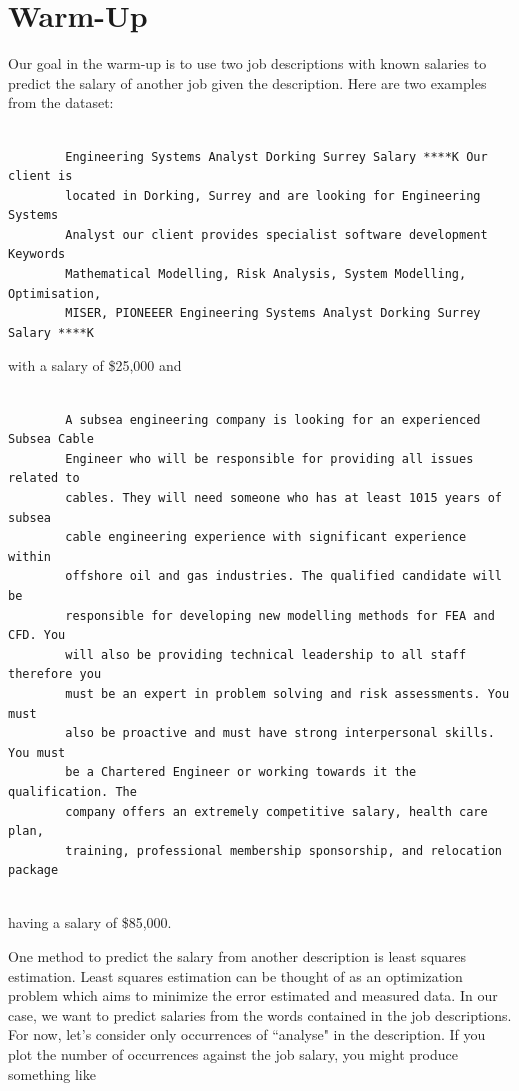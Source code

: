 \documentclass[12pt]{article}
\begin{document}
\section{Warm-Up}

    Our goal in the warm-up is to use two job descriptions with known
    salaries to predict the salary of another job given the description. Here
    are two examples from the dataset: 
    
    \begin{lstlisting}

        Engineering Systems Analyst Dorking Surrey Salary ****K Our client is
        located in Dorking, Surrey and are looking for Engineering Systems
        Analyst our client provides specialist software development Keywords
        Mathematical Modelling, Risk Analysis, System Modelling, Optimisation,
        MISER, PIONEEER Engineering Systems Analyst Dorking Surrey Salary ****K

    \end{lstlisting}

    with a salary of \$25,000 and 

    \begin{lstlisting}

        A subsea engineering company is looking for an experienced Subsea Cable
        Engineer who will be responsible for providing all issues related to
        cables. They will need someone who has at least 1015 years of subsea
        cable engineering experience with significant experience within
        offshore oil and gas industries. The qualified candidate will be
        responsible for developing new modelling methods for FEA and CFD. You
        will also be providing technical leadership to all staff therefore you
        must be an expert in problem solving and risk assessments. You must
        also be proactive and must have strong interpersonal skills. You must
        be a Chartered Engineer or working towards it the qualification. The
        company offers an extremely competitive salary, health care plan,
        training, professional membership sponsorship, and relocation package
    
    \end{lstlisting} having a salary of \$85,000.

    One method to predict the salary from another description is least squares estimation.
    Least squares estimation can be thought of as an optimization problem which aims to minimize the error estimated and measured data.
    In our case, we want to predict salaries from the words contained in the job descriptions.
    For now, let's consider only occurrences of ``analyse" in the description. 
    If you plot the number of occurrences against the job salary, you might produce something like
    
\end{document}
